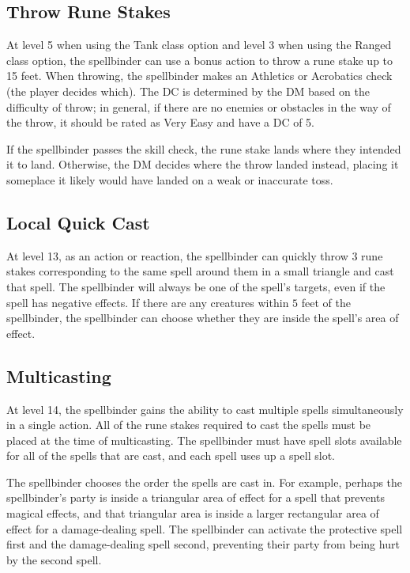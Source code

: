 \subsection{Throw Rune Stakes}
\label{ability:throw-rune-stakes}
At level 5 when using the Tank class option and level 3 when using the Ranged class option, the spellbinder can use a bonus action to throw a rune stake up to 15 feet. When throwing, the spellbinder makes an Athletics or Acrobatics check (the player decides which). The DC is determined by the DM based on the difficulty of throw; in general, if there are no enemies or obstacles in the way of the throw, it should be rated as Very Easy and have a DC of 5.

If the spellbinder passes the skill check, the rune stake lands where they intended it to land. Otherwise, the DM decides where the throw landed instead, placing it someplace it likely would have landed on a weak or inaccurate toss.

\subsection{Local Quick Cast}
At level 13, as an action or reaction, the spellbinder can quickly throw $3$ rune stakes corresponding to the same spell around them in a small triangle and cast that spell. The spellbinder will always be one of the spell's targets, even if the spell has negative effects. If there are any creatures within $5$ feet of the spellbinder, the spellbinder can choose whether they are inside the spell's area of effect.

\subsection{Multicasting}
At level 14, the spellbinder gains the ability to cast multiple spells simultaneously in a single action. All of the rune stakes required to cast the spells must be placed at the time of multicasting. The spellbinder must have spell slots available for all of the spells that are cast, and each spell uses up a spell slot.

The spellbinder chooses the order the spells are cast in. For example, perhaps the spellbinder's party is inside a triangular area of effect for a spell that prevents magical effects, and that triangular area is inside a larger rectangular area of effect for a damage-dealing spell. The spellbinder can activate the protective spell first and the damage-dealing spell second, preventing their party from being hurt by the second spell.

